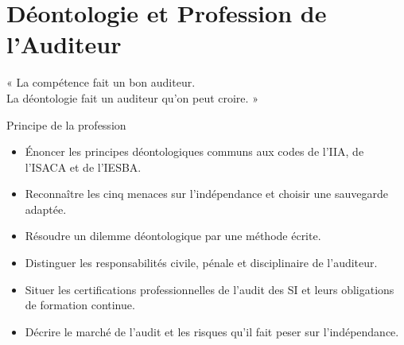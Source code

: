 
\chapter{Déontologie et Profession de l'Auditeur}
\label{chap:deontologie}

\epigraph{%
    « La compétence fait un bon auditeur.\\
    La déontologie fait un auditeur qu'on peut croire. »%
}{Principe de la profession}


\begin{boxobjectifs}
\begin{itemize}
    \item Énoncer les principes déontologiques communs aux codes de l'IIA,
          de l'ISACA et de l'IESBA.
    \item Reconnaître les cinq menaces sur l'indépendance et choisir une
          sauvegarde adaptée.
    \item Résoudre un dilemme déontologique par une méthode écrite.
    \item Distinguer les responsabilités civile, pénale et disciplinaire de
          l'auditeur.
    \item Situer les certifications professionnelles de l'audit des SI et
          leurs obligations de formation continue.
    \item Décrire le marché de l'audit et les risques qu'il fait peser sur
          l'indépendance.
\end{itemize}
\end{boxobjectifs}

